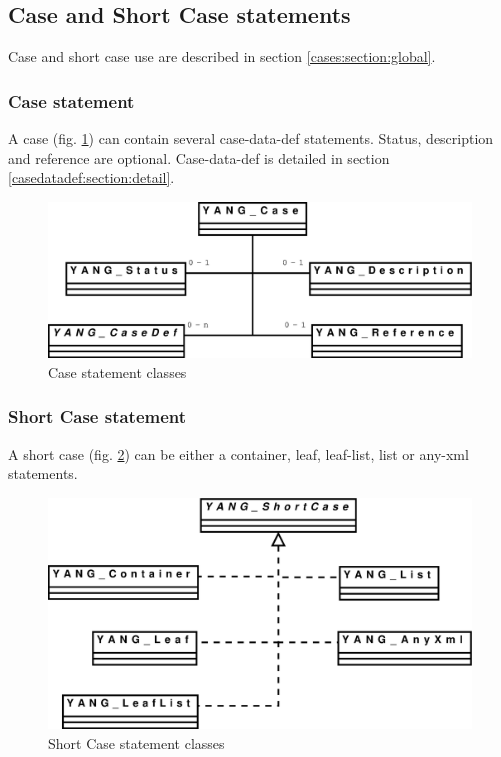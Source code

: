 \documentclass[a4paper]{article}
\begin{document}
\subsection{Case and Short Case statements}
\label{cases:section:detail}

Case and short case use are described in section \ref{cases:section:global}.

\subsubsection{Case statement}
\label{casedatadef:section:global}

A  case  (fig.    \ref{case})  can  contain  several  case-data-def
statements.     Status,      description     and     reference     are
optional.      Case-data-def     is      detailed      in     section
\ref{casedatadef:section:detail}.
\begin{figure}[htbp]
\begin{center}
\includegraphics[scale = .3]{case.eps}
\end{center}
\caption{Case statement classes}
\label{case}
\end{figure}

\subsubsection{Short Case statement}
A short case (fig. \ref{shortcase}) can be either a container, leaf,
leaf-list, list or any-xml statements.
\begin{figure}[htbp]
\begin{center}
\includegraphics[scale = .3]{shortcase.eps}
\end{center}
\caption{Short Case statement classes}
\label{shortcase}
\end{figure}
\end{document}
